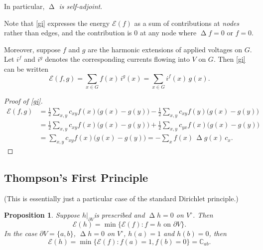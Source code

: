\documentclass[a4paper]{amsart}
\theoremstyle{plain}
\newtheorem{proposition}[theorem]{Proposition}
\theoremstyle{definition}
\theoremstyle{remark}
\DeclareMathOperator{\lap}{\Delta}
\begin{document}
 In particular, \emph{$ \lap $ is self-adjoint}.
 
Note that \eqref{gi} expresses the energy $ \mathcal{E}(f)$ as a sum of contributions at \emph{nodes} rather than edges, and the  contribution is $ 0 $ at any node where $ \lap f = 0 $ or $ f=0 $.  

Moreover, suppose  $ f $ and $ g  $  are the harmonic extensions of applied voltages on $ G$.  Let $ i^f $ and $ i^g $ denotes   the corresponding currents flowing into $  V  $ on $ G $.  Then \eqref{gi} can be written 
\begin{equation} \label{iof}
\boxed{\mathcal{E}(f,g)  = \sum_{x\in G} f(x)\, i^g(x)=    \sum_{x \in G} i^f(x)\,  g(x)   .}
\end{equation}
 
\begin{proof}[Proof of \eqref{gi}]
\begin{align*}
\mathcal{E}(f,g) &= \frac{1}{2} \sum_{x,y} c_{xy} f(x) \big( g(x) - g(y) \big) 
    - \frac{1}{2} \sum_{x,y} c_{xy} f(y) \big( g(x) - g(y) \big) \\
     &= \frac{1}{2} \sum_{x,y} c_{xy} f(x) \big( g(x) - g(y) \big) 
     + \frac{1}{2} \sum_{x,y} c_{yx} f(x) \big( g(x) - g(y) \big) \\
    &= \sum_{x,y} c_{xy} f(x) \big( g(x) - g(y) \big) = -\sum_x f(x)\, \lap g(x)\, c_x.
    \end{align*} 
\end{proof}
 
\subsection{Thompson's First Principle}  (This is essentially just a particular case of the standard Dirichlet principle.)
\begin{proposition}
Suppose $h|_{\partial V} $is  prescribed and $ \lap h = 0 $ on $ V^\circ$.  Then
\begin{equation} \label{t11} 
\boxed{\mathcal{E}(h) = \min \{ \mathcal{E}(f) : f=h \text{ on } \partial V\}.}
\end{equation} 
In the case $ \partial V = \{a,b\} $,   $ \lap h = 0 $ on $ V^\circ $, $ h(a) = 1 $ and $ h(b) = 0 $, then 
\begin{equation} \label{t12} 
\boxed{\mathcal{E}(h) = \min \{ \mathcal{E}(f) : f(a)=1, f(b)=0\} = \mathbb{C}_{ab}.}
\end{equation} 
\end{proposition} 
\end{document}
